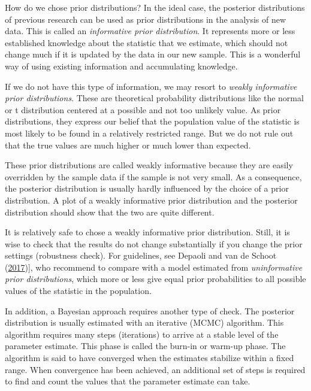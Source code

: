 \documentclass[doc]{apa6}
\begin{document}
How do we chose prior distributions? In the ideal case, the posterior
distributions of previous research can be used as prior distributions in
the analysis of new data. This is called an \emph{informative prior
distribution}. It represents more or less established knowledge about
the statistic that we estimate, which should not change much if it is
updated by the data in our new sample. This is a wonderful way of using
existing information and accumulating knowledge.

If we do not have this type of information, we may resort to
\emph{weakly informative prior distributions}. These are theoretical
probability distributions like the normal or t distribution centered at
a possible and not too unlikely value. As prior distributions, they
express our belief that the population value of the statistic is most
likely to be found in a relatively restricted range. But we do not rule
out that the true values are much higher or much lower than expected.

These prior distributions are called weakly informative because they are
easily overridden by the sample data if the sample is not very small. As
a consequence, the posterior distribution is usually hardly influenced
by the choice of a prior distribution. A plot of a weakly informative
prior distribution and the posterior distribution should show that the
two are quite different.

It is relatively safe to chose a weakly informative prior distribution.
Still, it is wise to check that the results do not change substantially
if you change the prior settings (robustness check). For guidelines, see
Depaoli and van de Schoot
(\protect\hyperlink{ref-depaoliImprovingTransparencyReplication2017}{2017}){]},
who recommend to compare with a model estimated from \emph{uninformative
prior distributions}, which more or less give equal prior probabilities
to all possible values of the statistic in the population.

In addition, a Bayesian approach requires another type of check. The
posterior distribution is usually estimated with an iterative (MCMC)
algorithm. This algorithm requires many steps (iterations) to arrive at
a stable level of the parameter estimate. This phase is called the
burn-in or warm-up phase. The algorithm is said to have converged when
the estimates stabilize within a fixed range. When convergence has been
achieved, an additional set of steps is required to find and count the
values that the parameter estimate can take.
\end{document}
